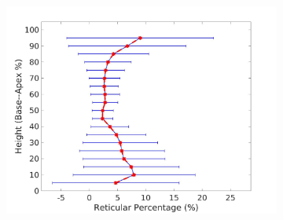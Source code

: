 \begin{figure}[H]
\begin{subfigure}{.4\linewidth}
  \includegraphics[width=\linewidth,trim={{.0\wd0} {.0\wd0} {.0\wd0} {.0\wd0}},clip]{QuantitativeAnalysis/Image/RightLungReticularDiseaseAgainstHeight.jpg}
  \caption{}
  \label{fig:DiseaseAgainstHeight-d}
\end{subfigure}
\begin{subfigure}{.4\linewidth}%

\end{subfigure}
\end{figure}
